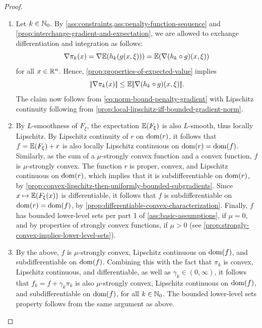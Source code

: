 \begin{proof}
    \begin{enumerate}
        \item Let $k\in\mathbb{N}_0$. By \cref{ass:constraints,ass:penalty-function-sequence}
        and \cref{prop:interchange-gradient-and-expectation},
        we are allowed to exchange differentiation
        and integration as follows:
        \[
            \nabla \pi_k(x) = \nabla \mathbb{E}(h_k(g(x, \xi))) = \mathbb{E}(\nabla (h_k \circ g)(x, \xi))
        \]
        for all $x\in\mathbb{R}^n$.
        Hence, \cref{prop:properties-of-expected-value} implies
        \[
            |\!|\nabla \pi_k(x)|\!| \leq \mathbb{E}|\!|\nabla (h_k \circ g)(x, \xi)|\!|.
        \]
        The claim now follows from \eqref{eq:norm-bound-penalty-gradient}
        with Lipschitz continuity following from \cref{prop:local-lipschitz-iff-bounded-gradient-norm}.
        \item By $L$-smoothness of $F_\xi$, the expectation $\mathbb{E}(F_\xi)$ is also $L$-smooth, thus
            locally Lipschitz. By Lipschitz continuity of $r$ on $\operatorname{dom}(r)$, it follows that $f = \mathbb{E}(F_\xi) + r$ is also
            locally Lipschitz continuous on $\operatorname{dom}(r) = \operatorname{dom}(f)$. Similarly, as the sum of a $\mu$-strongly convex function and a convex
            function, $f$ is $\mu$-strongly convex. The function $r$ is proper, convex, and Lipschitz continuous
            on $\operatorname{dom}(r)$, which implies that it is subdifferentiable on $\operatorname{dom}(r)$, by \cref{prop:convex-lipschitz-then-uniformly-bounded-subgradients}.
            Since $x\mapsto \mathbb{E}(F_\xi(x))$ is
            differentiable, it follows that $f$ is subdifferentiable on $\operatorname{dom}(r) = \operatorname{dom}(f)$,
            by \cref{prop:differentiable-convex-characterization}.
            Finally, $f$ has bounded lower-level sets per part 1 of \cref{ass:basic-assumptions}, if $\mu = 0$,
            and by properties of strongly convex functions, if $\mu > 0$ (see \cref{prop:strongly-convex-implies-lower-level-sets}).
        \item By the above, $f$ is $\mu$-strongly convex,
            Lipschitz continuous on $\operatorname{dom}(f)$, and subdifferentiable on $\operatorname{dom}(f)$.
            Combining this with the fact that
            $\pi_k$ is convex, Lipschitz continuous, and differentiable, as well as $\gamma_k \in (0,\infty)$,
            it follows that $f_k = f + \gamma_k \pi_k$
            is also $\mu$-strongly convex,
            Lipschitz continuous on $\operatorname{dom}(f)$, and subdifferentiable on $\operatorname{dom}(f)$, for all $k\in\mathbb{N}_0$.
            The bounded lower-level sets property follows from the same argument as above.

\end{enumerate}
\end{proof}
